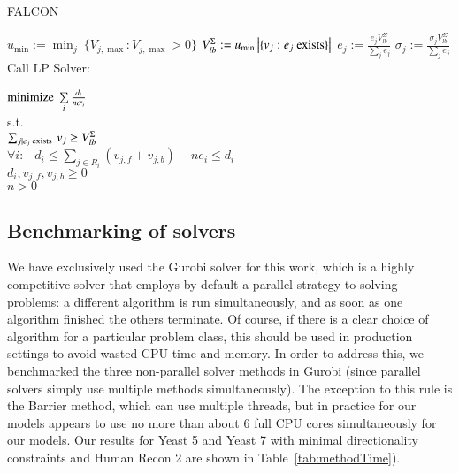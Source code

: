 \begin{algorithm}
\caption{FALCON}
\label{alg:FALCON}
\begin{algorithmic}
\State $u_{\min} := \min_j\ \{V_{j,\max} : V_{j,\max} > 0\}$
\State $V_{lb}^{\Sigma} := u_{\min} \left|\{v_j : e_j \textnormal{ exists}\}\right|$
  \State $e_j := \frac{e_j V_{lb}^{\Sigma}}
    {\sum\limits_{j} e_j}$ 
  \State $\sigma_j := \frac{\sigma_j V_{lb}^{\Sigma}}
    {\sum\limits_{j} e_j}$
\EndFor
{}
  \State Call LP Solver:
  \State \hspace{4.8mm} \parbox[t]{\dimexpr\linewidth-\algorithmicindent}{
    $\textnormal{minimize}\ \sum\limits_i \frac{d_i}{n \sigma_i}$\\
    s.t.\\
    $\sum_{j \mid e_j \textnormal{ exists }} v_j \geq V_{lb}^{\Sigma}$\\ 
    $\forall i: -d_i \leq \sum\nolimits_{j \in R_i} (v_{j,f} +
    v_{j,b}) - n e_i \leq d_i$\\ 
    $d_i, v_{j,f}, v_{j,b} \geq 0$\\ 
    $n > 0$
    \strut}
  \EndFor
\EndWhile
\end{algorithmic}
\end{algorithm}


\subsection{Benchmarking of solvers}
We have exclusively used the Gurobi solver \citep{gurobi} for this
work, which is a highly competitive solver that employs by default a
parallel strategy to solving problems: a different algorithm is run
simultaneously, and as soon as one algorithm finished the others
terminate. Of course, if there is a clear choice of algorithm for a
particular problem class, this should be used in production settings
to avoid wasted CPU time and memory. In order to address this, we
benchmarked the three non-parallel solver methods in Gurobi
 (since parallel solvers simply use multiple methods simultaneously).
The exception to this rule is the Barrier method, which can use
multiple threads, but in practice for our models appears to use
no more than about 6 full CPU cores simultaneously for our models.
Our results for Yeast 5 and Yeast 7 with minimal directionality constraints
\citep{Heavner2012,Lee2012,Aung2013} and Human Recon 2 \citep{Thiele2013}
are shown in \suppOrApp Table~\ref{tab:methodTime}).

